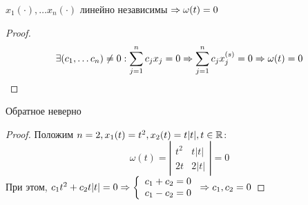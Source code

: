 \begin{proposition}
    \(x_1(\cdot), \dots x_n(\cdot)\) линейно независимы \(\Rightarrow \omega(t) = 0\)
\end{proposition}
\begin{proof}
    \[\exists (c_1, \dots c_n) \ne 0: \sum_{j = 1}^n c_jx_j = 0 \Rightarrow \sum_{j = 1}^n c_jx_j^{(s)} = 0 \Rightarrow \omega(t) = 0\]
\end{proof}

\begin{note}
    Обратное неверно
\end{note}
\begin{proof}
    Положим \(n = 2, x_1(t) = t^2, x_2(t) = t|t|, t \in \mathbb{R}\):
    \[\omega(t) = \left| \begin{array}{cc}
        t^2 & t|t| \\
        2t & 2|t|
    \end{array} \right| = 0\]
    При этом, \(c_1t^2 + c_2t|t| = 0 \Rightarrow \left\{\begin{array}{l}
        c_1 + c_2 = 0 \\
        c_1 - c_2 = 0
    \end{array}\right. \Rightarrow c_1, c_2 = 0\)
\end{proof}

